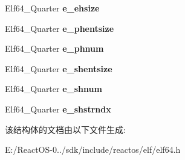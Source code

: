 \begin{DoxyCompactItemize}
Elf64\+\_\+\+Quarter {\bfseries e\+\_\+ehsize}
\item 
\mbox{\label{struct_elf64___ehdr_ae14e9a47f10b90188a092f67d5a9e2af}} 
Elf64\+\_\+\+Quarter {\bfseries e\+\_\+phentsize}
\item 
\mbox{\label{struct_elf64___ehdr_afc1d64ee03edb05ad57c82c1dbf81d2b}} 
Elf64\+\_\+\+Quarter {\bfseries e\+\_\+phnum}
\item 
\mbox{\label{struct_elf64___ehdr_a8908ed57d537c079c4d61b8b027ec52e}} 
Elf64\+\_\+\+Quarter {\bfseries e\+\_\+shentsize}
\item 
\mbox{\label{struct_elf64___ehdr_a434b769986fb904b44862ab4739b1816}} 
Elf64\+\_\+\+Quarter {\bfseries e\+\_\+shnum}
\item 
\mbox{\label{struct_elf64___ehdr_a135a81ba8e1bc80f65b1fdb9823d8b2b}} 
Elf64\+\_\+\+Quarter {\bfseries e\+\_\+shstrndx}
\end{DoxyCompactItemize}


该结构体的文档由以下文件生成\+:\begin{DoxyCompactItemize}
\item 
E\+:/\+React\+O\+S-\/0../sdk/include/reactos/elf/elf64.\+h\end{DoxyCompactItemize}
